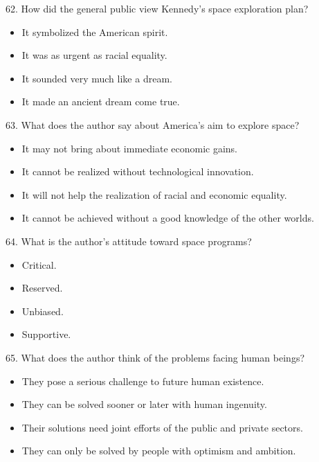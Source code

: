 \documentclass[UTF8,11pt]{ctexart}
\begin{document}
62. How did the general public view Kennedy’s space exploration plan?


\begin{itemize}[leftmargin=2em,itemsep=.2em,topsep=.4em]\item[A.] It symbolized the American spirit.
\item[B.] It was as urgent as racial equality.
\item[C.] It sounded very much like a dream.
\item[D.] It made an ancient dream come true.
\end{itemize}

63. What does the author say about America’s aim to explore space?


\begin{itemize}[leftmargin=2em,itemsep=.2em,topsep=.4em]\item[A.] It may not bring about immediate economic gains.
\item[B.] It cannot be realized without technological innovation.
\item[C.] It will not help the realization of racial and economic equality.
\item[D.] It cannot be achieved without a good knowledge of the other worlds.
\end{itemize}

64. What is the author’s attitude toward space programs?


\begin{itemize}[leftmargin=2em,itemsep=.2em,topsep=.4em]\item[A.] Critical.
\item[B.] Reserved.
\item[C.] Unbiased.
\item[D.] Supportive.
\end{itemize}

65. What does the author think of the problems facing human beings?


\begin{itemize}[leftmargin=2em,itemsep=.2em,topsep=.4em]\item[A.] They pose a serious challenge to future human existence.
\item[B.] They can be solved sooner or later with human ingenuity.
\item[C.] Their solutions need joint efforts of the public and private sectors.
\item[D.] They can only be solved by people with optimism and ambition.
\end{itemize}
\end{document}
